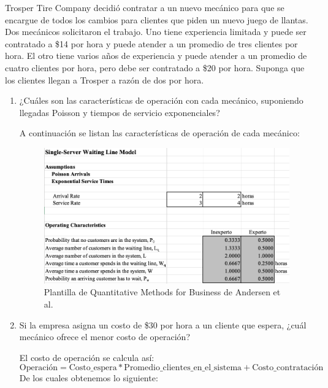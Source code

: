 





\begin{problema}
	Trosper Tire Company decidió contratar a un nuevo mecánico para que se encargue de todos los cambios para clientes que piden un nuevo juego de llantas. Dos mecánicos solicitaron el trabajo. Uno tiene experiencia limitada y puede ser contratado a \$14 por hora y puede atender a un promedio de tres clientes por hora. El otro tiene varios años de experiencia y puede atender a un promedio de cuatro clientes por hora, pero debe ser contratado a \$20 por hora. Suponga que los clientes llegan a Trosper a razón de dos por hora.
	\begin{enumerate}
		\item ¿Cuáles son las características de operación con cada mecánico, suponiendo llegadas Poisson y tiempos de servicio exponenciales?
		\begin{sol}
			A continuación se listan las características de operación de cada mecánico: 
			\begin{figure}[H]
				\centering
				\includegraphics[scale=0.4]{Images/1}
				\caption{Plantilla de Quantitative Methods for Business de Andersen et al. }
			\end{figure}
		\end{sol}
		\item Si la empresa asigna un costo de \$30 por hora a un cliente que espera, ¿cuál mecánico ofrece el menor costo de operación?
		\begin{sol}
			El costo de operación se calcula así: 
			$$ \text{Operación}=\text{Costo\_espera}*\text{Promedio\_clientes\_en\_el\_sistema}+\text{Costo\_contratación} $$
			De los cuales obtenemos lo siguiente: 

\end{sol}
\end{enumerate}
\end{problema}
